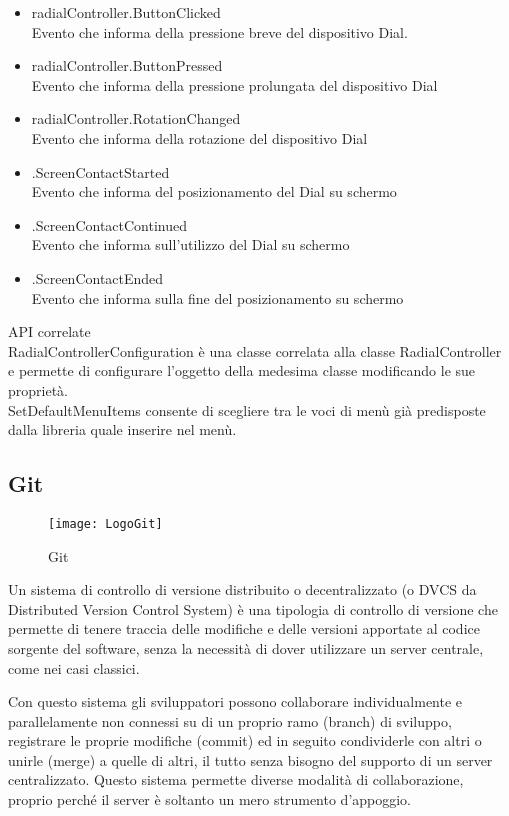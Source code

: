 \begin{itemize}
\item radialController.ButtonClicked\\
Evento che informa della pressione breve del dispositivo Dial.
\item radialController.ButtonPressed\\
Evento che informa della pressione prolungata del dispositivo Dial
\item radialController.RotationChanged\\
Evento che informa della rotazione del dispositivo Dial
\item .ScreenContactStarted\\
Evento che informa del posizionamento del Dial su schermo
\item .ScreenContactContinued\\
Evento che informa sull’utilizzo del Dial su schermo
\item .ScreenContactEnded\\
Evento che informa sulla fine del posizionamento su schermo
\end{itemize}
API correlate\\
RadialControllerConfiguration è una classe correlata alla classe RadialController e permette di configurare l’oggetto della medesima classe modificando le sue proprietà.\\
SetDefaultMenuItems consente di scegliere tra le voci di menù già predisposte dalla libreria quale inserire nel menù.

\newpage
\subsection{Git}
\begin{figure}[htpb!]
\center
  \texttt{[image: LogoGit]}
  \caption{Git}
\end{figure}
Un sistema di controllo di versione\cite{git} distribuito o decentralizzato (o DVCS da Distributed Version Control System) è una tipologia di controllo di versione che permette di tenere traccia delle modifiche e delle versioni apportate al codice sorgente del software, senza la necessità di dover utilizzare un server centrale, come nei casi classici.

Con questo sistema gli sviluppatori possono collaborare individualmente e parallelamente non connessi su di un proprio ramo (branch) di sviluppo, registrare le proprie modifiche (commit) ed in seguito condividerle con altri o unirle (merge) a quelle di altri, il tutto senza bisogno del supporto di un server centralizzato. Questo sistema permette diverse modalità di collaborazione, proprio perché il server è soltanto un mero strumento d'appoggio.
